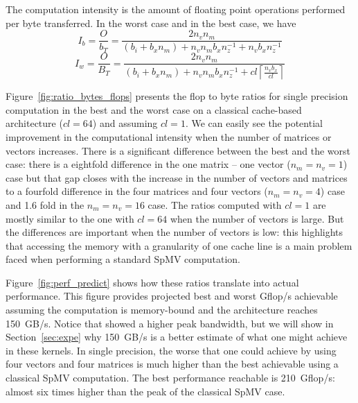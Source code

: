 \documentclass{sig-alternate}
\newcommand{\ceil}[1]{\left\lceil#1\right\rceil}
\begin{document}
The computation intensity is the amount of floating point operations performed per
byte transferred. In the worst case and in the best case, we have
$$I_b = \frac{O}{b_T} = \frac{2 n_v n_m}{ (b_i + b_x n_m) + n_v n_m b_x n_z^{-1} + n_v b_x n_z^{-1} }$$
$$I_w = \frac{O}{B_T} = \frac{2 n_v n_m}{(b_i+b_x n_m) + n_v n_m b_x n_z^{-1} + cl \ceil{\frac{n_vb_x}{cl}} }$$


Figure~\ref{fig:ratio_bytes_flops} presents the flop to byte ratios
for single precision computation in the best and the worst case on a
classical cache-based architecture ($cl = 64$) and assuming $cl=1$. We
can easily see the potential improvement in the computational
intensity when the number of matrices or vectors increases. There is a
significant difference between the best and the worst case: there is a
eightfold difference in the one matrix -- one vector ($n_m=n_v=1$) case but that gap closes
with the increase in the number of vectors and matrices to a fourfold
difference in the four matrices and four vectors ($n_m=n_v=4$) case and 1.6 fold in the 
$n_m=n_v=16$ case. 
The ratios computed with $cl = 1$ are mostly
similar to the one with $cl=64$ when the number of vectors is
large. But the differences are important when the number of vectors is
low: this highlights that accessing the memory with a granularity of one cache
line is a main problem faced when performing a standard SpMV computation.

Figure~\ref{fig:perf_predict} shows how these ratios translate
into actual performance. This figure provides projected best and worst
Gflop/s achievable assuming the computation is memory-bound and the
architecture reaches 150~GB/s. Notice that \cite{Saule13-ARXIV}
showed a higher peak bandwidth, but we will show in
Section~\ref{sec:expe} why 150~GB/s is a better estimate of what one
might achieve in these kernels. In single precision, the worse that
one could achieve by using four vectors and four matrices is much higher
than the best achievable using a classical SpMV computation. The best
performance reachable is 210~Gflop/s: almost six times higher than the
peak of the classical SpMV case. 
\end{document}
